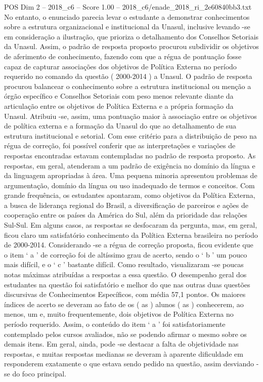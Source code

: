 \begin{textsample}{POS Dim 2 – 2018\_c6 – Score 1.00 – 2018\_c6/enade\_2018\_ri\_2e60840bb3.txt}
No entanto, o enunciado parecia levar o estudante a demonstrar conhecimentos sobre a estrutura organizacional e institucional da Unasul, inclusive levando -se em consideração a ilustração, que prioriza o detalhamento dos Conselhos Setoriais da Unasul.
Assim, o padrão de resposta proposto procurou subdividir os objetivos de aferimento de conhecimento, fazendo com que a régua de pontuação fosse capaz de capturar associações dos objetivos de Política Externa no período requerido no comando da questão ( 2000-2014 ) a Unasul.
O padrão de resposta procurou balancear o conhecimento sobre a estrutura institucional ou menção a órgão específico e Conselhos Setoriais com peso menos relevante diante da articulação entre os objetivos de Política Externa e a própria formação da Unasul.
Atribuiu -se, assim, uma pontuação maior à associação entre os objetivos de política externa e a formação da Unasul do que ao detalhamento de sua estrutura institucional e setorial.
Com esse critério para a distribuição de peso na régua de correção, foi possível conferir que as interpretações e variações de respostas encontradas estavam contempladas no padrão de resposta proposto.
As respostas, em geral, atenderam a um padrão de exigência no domínio da língua e da linguagem apropriadas à área.
Uma pequena minoria apresentou problemas de argumentação, domínio da língua ou uso inadequado de termos e conceitos.
Com grande frequência, os estudantes apontaram, como objetivos da Política Externa, a busca de liderança regional do Brasil, a diversificação de parceiros e ações de cooperação entre os países da América do Sul, além da prioridade das relações Sul-Sul.
Em alguns casos, as respostas se desfocaram da pergunta, mas, em geral, ficou claro um satisfatório conhecimento da Política Externa brasileira no período de 2000-2014.
Considerando -se a régua de correção proposta, ficou evidente que o item ‘ a ’ de correção foi de altíssimo grau de acerto, sendo o ‘ b ’ um pouco mais difícil, e o ‘ c ’ bastante difícil.
Como resultado, visualizaram -se poucas notas máximas atribuídas a respostas a essa questão.
O desempenho geral dos estudantes na questão foi satisfatório e melhor do que nas outras duas questões discursivas de Conhecimentos Específicos, com média 57,1 pontos.
Os maiores índices de acerto se deveram ao fato de os ( as ) alunos ( as ) conhecerem, ao menos, um e, muito frequentemente, dois objetivos de Política Externa no período requerido.
Assim, o conteúdo do item ‘ a ’ foi satisfatoriamente contemplado pelos cursos avaliados, não se podendo afirmar o mesmo sobre os demais itens.
Em geral, ainda, pode -se destacar a falta de objetividade nas respostas, e muitas respostas medianas se deveram à aparente dificuldade em responderem exatamente o que estava sendo pedido na questão, assim desviando -se do foco principal.

\end{textsample}
